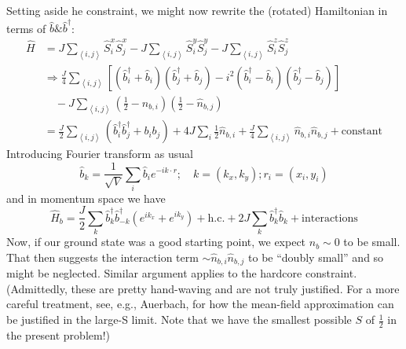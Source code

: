 Setting aside he constraint, we might now rewrite the (rotated) Hamiltonian in terms of $\hat{b}\& \hat{b}^\dagger$:
\begin{align*}
    \hat{H}&=J\sum_{\left< i,j \right>}{\hat{S}_{i}^{x}\hat{S}_{j}^{x}}-J\sum_{\left< i,j \right>}{\hat{S}_{i}^{y}\hat{S}_{j}^{y}}-J\sum_{\left< i,j \right>}{\hat{S}_{i}^{z}\hat{S}_{j}^{z}}\\
    &\Rightarrow \frac{J}{4}\sum_{\left< i,j \right>}{\left[ \left( \hat{b}_{i}^{\dagger}+\hat{b}_i \right) \left( \hat{b}_{j}^{\dagger}+\hat{b}_j \right) -i^2\left( \hat{b}_{i}^{\dagger}-\hat{b}_i \right) \left( \hat{b}_{j}^{\dagger}-\hat{b}_j \right) \right]}\\
    &\quad -J\sum_{\left< i,j \right>}{\left( \frac{1}{2}-\hat{n}_{b,i} \right)}\left( \frac{1}{2}-\hat{n}_{b,j} \right) \\
    &=\frac{J}{2}\sum_{\left< i,j \right>}{\left( \hat{b}_{i}^{\dagger}\hat{b}_{j}^{\dagger}+b_ib_j \right)}+4J\sum_i{\frac{1}{2}\hat{n}_{b,i}}+\frac{J}{4}\sum_{\left< i,j \right>}{\hat{n}_{b,i}\hat{n}_{b,j}}+\mathrm{constant}
\end{align*}
Introducing Fourier transform as usual
\[ \hat{b}_k=\frac{1}{\sqrt{V}}\sum_i{\hat{b}_ie^{-ik\cdot r}};\quad k=\left( k_x,k_y \right) ;r_i=\left( x_i,y_i \right) \]
and in momentum space we have
\[ \hat{H}_b=\frac{J}{2}\sum_k{\hat{b}_{k}^{\dagger}\hat{b}_{-k}^{\dagger}\left( e^{ik_x}+e^{ik_y} \right)}+\mathrm{h}.\mathrm{c}.+2J\sum_k{\hat{b}_{k}^{\dagger}\hat{b}_k}+\mathrm{interactions}\]
Now, if our ground state was a good starting point, we expect $n_b\sim 0$ to be small. That then suggests the interaction term $\sim \hat{n}_{b,i}\hat{n}_{b,j}$ to be ``doubly small'' and so might be neglected. Similar argument applies to the hardcore constraint. (Admittedly, these are pretty hand-waving and are not truly justified. For a more careful treatment, see, e.g., Auerbach, for how the mean-field approximation can be justified in the large-S limit. Note that we have the smallest possible $S$ of $\frac{1}{2}$ in the present problem!)

